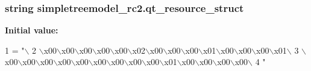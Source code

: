 \subsubsection[{qt\+\_\+resource\+\_\+struct}]{\setlength{\rightskip}{0pt plus 5cm}string simpletreemodel\+\_\+rc2.\+qt\+\_\+resource\+\_\+struct}\label{namespacesimpletreemodel__rc2_a3acc1ed0ab57c911ae0dff27956e0e30}
{\bfseries Initial value\+:}
\begin{DoxyCode}
1 = \textcolor{stringliteral}{"\(\backslash\)}
2 \textcolor{stringliteral}{\(\backslash\)x00\(\backslash\)x00\(\backslash\)x00\(\backslash\)x00\(\backslash\)x00\(\backslash\)x02\(\backslash\)x00\(\backslash\)x00\(\backslash\)x00\(\backslash\)x01\(\backslash\)x00\(\backslash\)x00\(\backslash\)x00\(\backslash\)x01\(\backslash\)}
3 \textcolor{stringliteral}{\(\backslash\)x00\(\backslash\)x00\(\backslash\)x00\(\backslash\)x00\(\backslash\)x00\(\backslash\)x00\(\backslash\)x00\(\backslash\)x00\(\backslash\)x00\(\backslash\)x01\(\backslash\)x00\(\backslash\)x00\(\backslash\)x00\(\backslash\)x00\(\backslash\)}
4 \textcolor{stringliteral}{"}
\end{DoxyCode}
